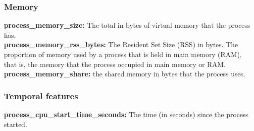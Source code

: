 \documentclass{iosart2c}
\begin{document}
\subsubsection{Memory}

\textbf{process\_memory\_size:} The total in bytes of virtual memory that the process has.\\

\textbf{process\_memory\_rss\_bytes:} The Resident Set Size (RSS) in bytes. The proportion of memory used by a process that is held in main memory (RAM), that is, the memory that the process occupied in main memory or RAM.\\

\textbf{process\_memory\_share:} the shared memory in bytes that the process uses.\\

\subsubsection{Temporal features}

\textbf{process\_cpu\_start\_time\_seconds:} The time (in seconds) since the process started.





%
%

%
\end{document}
